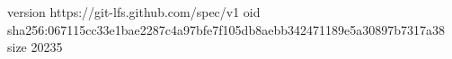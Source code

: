 version https://git-lfs.github.com/spec/v1
oid sha256:067115cc33e1bae2287c4a97bfe7f105db8aebb342471189e5a30897b7317a38
size 20235
